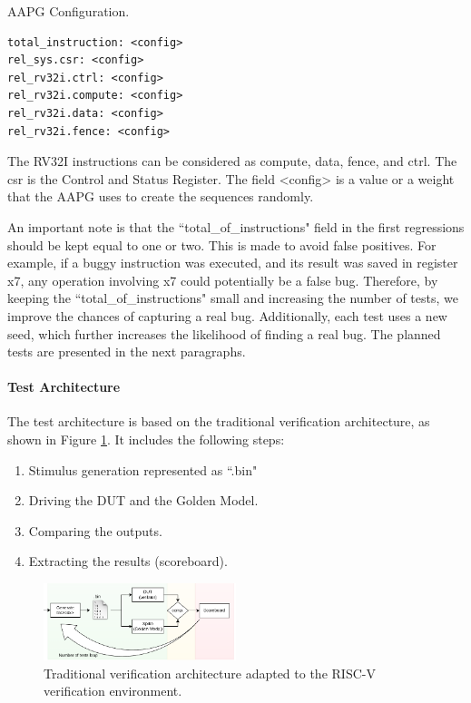 \begin{listing}[h!]
\caption{AAPG Configuration.}
\label{lst:c1l3_yaml}
\begin{verbatim}
total_instruction: <config>
rel_sys.csr: <config>
rel_rv32i.ctrl: <config>
rel_rv32i.compute: <config>
rel_rv32i.data: <config>
rel_rv32i.fence: <config>
\end{verbatim}
\end{listing}

The RV32I instructions can be considered as compute, data, fence, and ctrl. The csr is the Control and Status Register. The field <config> is a value or a weight that the AAPG uses to create the sequences randomly.

An important note is that the ``total\_of\_instructions" field in the first regressions should be kept equal to one or two. This is made to avoid false positives. For example, if a buggy instruction was executed, and its result was saved in register x7, any operation involving x7 could potentially be a false bug. Therefore, by keeping the ``total\_of\_instructions" small and increasing the number of tests, we improve the chances of capturing a real bug. Additionally, each test uses a new seed, which further increases the likelihood of finding a real bug. The planned tests are presented in the next paragraphs.

\paragraph{Test Architecture}

The test architecture is based on the traditional verification architecture, as shown in Figure \ref{fig:arch}. It includes the following steps:

\begin{enumerate}
    \item Stimulus generation represented as ``.bin"
    \item Driving the DUT and the Golden Model.
    \item Comparing the outputs.
    \item Extracting the results (scoreboard).
\end{enumerate}

\begin{figure}[H]
    \centering
    \includegraphics[width=0.5\textwidth]{./c3l1_img/arch.png}
    \caption{Traditional verification architecture adapted to the RISC-V verification environment.}
    \label{fig:arch}
\end{figure}

